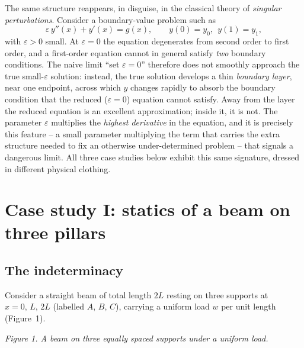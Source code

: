\documentclass[11pt]{article}
\begin{document}
The same structure reappears, in disguise, in the classical theory of \emph{singular perturbations}. Consider a boundary-value problem such as
\begin{equation}
\varepsilon\, y''(x) + y'(x) = g(x), \qquad y(0)=y_0,\ \ y(1)=y_1,
\end{equation}
with $\varepsilon>0$ small. At $\varepsilon=0$ the equation degenerates from second order to first order, and a first-order equation cannot in general satisfy \emph{two} boundary conditions. The naive limit ``set $\varepsilon=0$'' therefore does not smoothly approach the true small-$\varepsilon$ solution: instead, the true solution develops a thin \emph{boundary layer}, near one endpoint, across which $y$ changes rapidly to absorb the boundary condition that the reduced ($\varepsilon=0$) equation cannot satisfy. Away from the layer the reduced equation is an excellent approximation; inside it, it is not. The parameter $\varepsilon$ multiplies the \emph{highest derivative} in the equation, and it is precisely this feature -- a small parameter multiplying the term that carries the extra structure needed to fix an otherwise under-determined problem -- that signals a dangerous limit. All three case studies below exhibit this same signature, dressed in different physical clothing.

\section{Case study I: statics of a beam on three pillars}

\subsection{The indeterminacy}

Consider a straight beam of total length $2L$ resting on three supports at $x=0,\,L,\,2L$ (labelled $A$, $B$, $C$), carrying a uniform load $w$ per unit length (Figure~1).

\begin{center}

\emph{Figure 1. A beam on three equally spaced supports under a uniform load.}
\end{center}
\end{document}
